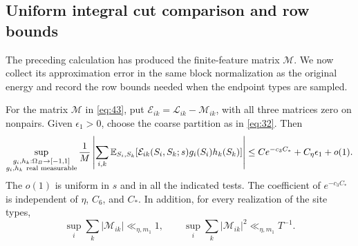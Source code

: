 \subsection{Uniform integral cut comparison and row bounds}

The preceding calculation has produced the finite-feature matrix
$\mathcal M$. We now collect its approximation error in the same block
normalization as the original energy and record the row bounds needed
when the endpoint types are sampled.

\begin{proposition}\label{prop:kernel-comparison}
For the matrix \(\mathcal M\) in \eqref{eq:43}, put
\(\mathcal E_{ik}=\mathcal L_{ik}-\mathcal M_{ik}\), with all three
matrices zero on nonpairs.  Given \(\epsilon_1>0\), choose the coarse
partition as in \eqref{eq:32}.  Then
\begin{equation}\label{eq:44}
 \sup_{\substack{g_i,h_k:\Omega_B\to[-1,1]\\
                  g_i,h_k\ \text{real measurable}}}
 \frac1M\left|
  \sum_{i,k}\mathbb E_{S_i,S_k}
      [\mathcal E_{ik}(S_i,S_k;s)g_i(S_i)h_k(S_k)]\right|
 \le C e^{-c_3C_*}+C_\eta\epsilon_1+o(1).
\end{equation}
The \(o(1)\) is uniform in \(s\) and in all the indicated tests.
The coefficient of \(e^{-c_3C_*}\) is independent of \(\eta\),
\(C_6\), and \(C_*\).  In addition, for every realization of the
site types,
\begin{equation}\label{eq:kernel-main-row-bounds}
 \sup_i\sum_k|\mathcal M_{ik}|\ll_{\eta,m_1}1,
 \qquad
 \sup_i\sum_k|\mathcal M_{ik}|^2\ll_{\eta,m_1}T^{-1}.
\end{equation}
\end{proposition}

